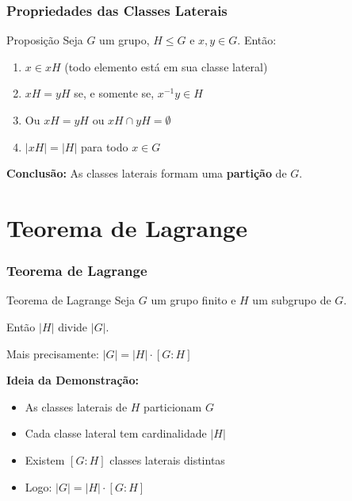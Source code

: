 \documentclass{beamer}
\begin{document}
\begin{frame}
\frametitle{Propriedades das Classes Laterais}

\begin{exampleblock}{Proposição}
Seja $G$ um grupo, $H \leq G$ e $x, y \in G$. Então:
\begin{enumerate}
\item $x \in xH$ (todo elemento está em sua classe lateral)
\pause
\item $xH = yH$ se, e somente se, $x^{-1}y \in H$
\pause
\item Ou $xH = yH$ ou $xH \cap yH = \emptyset$
\pause
\item $|xH| = |H|$ para todo $x \in G$
\end{enumerate}
\end{exampleblock}

\pause

\textbf{Conclusão:} As classes laterais formam uma \textbf{partição} de $G$.

\end{frame}

\section{Teorema de Lagrange}

\begin{frame}
\frametitle{Teorema de Lagrange}

\begin{alertblock}{Teorema de Lagrange}
Seja $G$ um grupo finito e $H$ um subgrupo de $G$.

Então $|H|$ divide $|G|$.

Mais precisamente: $|G| = |H| \cdot [G:H]$
\end{alertblock}

\pause

\textbf{Ideia da Demonstração:}
\begin{itemize}
\item As classes laterais de $H$ particionam $G$
\item Cada classe lateral tem cardinalidade $|H|$
\item Existem $[G:H]$ classes laterais distintas
\item Logo: $|G| = |H| \cdot [G:H]$
\end{itemize}

\end{frame}
\end{document}
